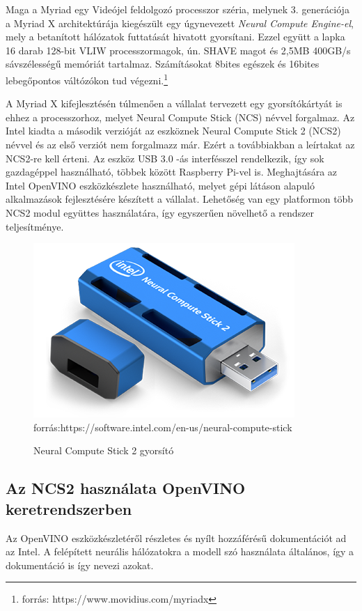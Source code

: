 Maga a Myriad egy Videójel feldolgozó processzor széria, melynek 3. generációja a Myriad X architektúrája kiegészült egy úgynevezett \emph{Neural Compute Engine-el}, mely a betanított hálózatok futtatását hivatott gyorsítani. Ezzel együtt a lapka 16 darab 128-bit VLIW processzormagok, ún. SHAVE magot és 2,5MB 400GB/s sávszélességű memóriát tartalmaz. Számításokat 8bites egészek és 16bites lebegőpontos váltózókon tud végezni.\footnote{forrás: https://www.movidius.com/myriadx} 

A Myriad X kifejlesztésén túlmenően a vállalat tervezett egy gyorsítókártyát is ehhez a processzorhoz, melyet Neural Compute Stick (NCS) névvel forgalmaz. Az Intel kiadta a második verzióját az eszköznek  Neural Compute Stick 2 (NCS2) névvel és az első verziót nem forgalmazz már. Ezért a továbbiakban a leírtakat az NCS2-re kell érteni.
Az eszköz USB 3.0 -ás interfésszel rendelkezik, így sok gazdagéppel használható, többek között Raspberry Pi-vel is. Meghajtására az Intel OpenVINO eszközkészlete használható, melyet gépi látáson alapuló alkalmazások fejlesztésére készített a vállalat. Lehetőség van egy platformon több NCS2 modul együttes használatára, így egyszerűen növelhető a rendszer teljesítménye.
\begin{figure}[h]
	\centering
	\includegraphics[width=0.5\linewidth]{fig/NCS2-specs}\\
	\footnotesize forrás:https://software.intel.com/en-us/neural-compute-stick
	\caption{Neural Compute Stick 2 gyorsító} 
	\label{fig:ncs2-specs}
\end{figure}

\subsection{Az NCS2 használata OpenVINO keretrendszerben}
Az OpenVINO eszközkészletéről részletes és nyílt hozzáférésű dokumentációt ad az Intel. \cite{web:OpenVINO} A felépített neurális hálózatokra a modell szó használata általános, így a dokumentáció is így nevezi azokat.

